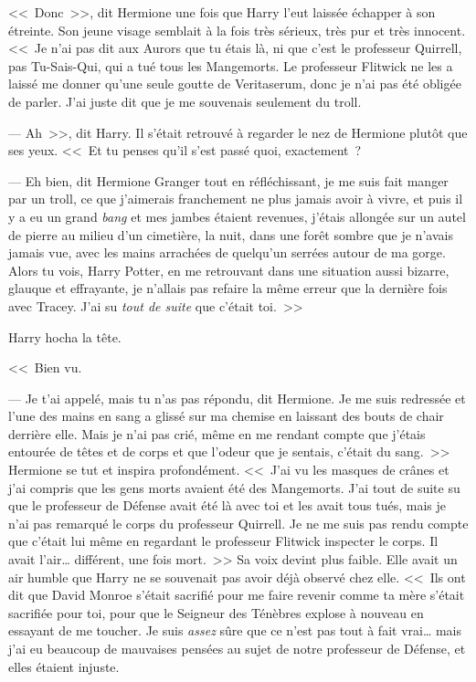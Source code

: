 <<~Donc~>>, dit Hermione une fois que Harry l'eut laissée échapper à son étreinte. Son jeune visage semblait à la fois très sérieux, très pur et très innocent. <<~Je n'ai pas dit aux Aurors que tu étais là, ni que c'est le professeur Quirrell, pas Tu-Sais-Qui, qui a tué tous les Mangemorts. Le professeur Flitwick ne les a laissé me donner qu'une seule goutte de Veritaserum, donc je n'ai pas été obligée de parler. J'ai juste dit que je me souvenais seulement du troll.

--- Ah~>>, dit Harry. Il s'était retrouvé à regarder le nez de Hermione plutôt que ses yeux. <<~Et tu penses qu'il s'est passé quoi, exactement~?

--- Eh bien, dit Hermione Granger tout en réfléchissant, je me suis fait manger par un troll, ce que j'aimerais franchement ne plus jamais avoir à vivre, et puis il y a eu un grand \emph{bang} et mes jambes étaient revenues, j'étais allongée sur un autel de pierre au milieu d'un cimetière, la nuit, dans une forêt sombre que je n'avais jamais vue, avec les mains arrachées de quelqu'un serrées autour de ma gorge. Alors tu vois, Harry Potter, en me retrouvant dans une situation aussi bizarre, glauque et effrayante, je n'allais pas refaire la même erreur que la dernière fois avec Tracey. J'ai su \emph{tout de suite} que c'était toi.~>>

Harry hocha la tête.

<<~Bien vu.

--- Je t'ai appelé, mais tu n'as pas répondu, dit Hermione. Je me suis redressée et l'une des mains en sang a glissé sur ma chemise en laissant des bouts de chair derrière elle. Mais je n'ai pas crié, même en me rendant compte que j'étais entourée de têtes et de corps et que l'odeur que je sentais, c'était du sang.~>> Hermione se tut et inspira profondément. <<~J'ai vu les masques de crânes et j'ai compris que les gens morts avaient été des Mangemorts. J'ai tout de suite su que le professeur de Défense avait été là avec toi et les avait tous tués, mais je n'ai pas remarqué le corps du professeur Quirrell. Je ne me suis pas rendu compte que c'était lui même en regardant le professeur Flitwick inspecter le corps. Il avait l'air… différent, une fois mort.~>> Sa voix devint plus faible. Elle avait un air humble que Harry ne se souvenait pas avoir déjà observé chez elle. <<~Ils ont dit que David Monroe s'était sacrifié pour me faire revenir comme ta mère s'était sacrifiée pour toi, pour que le Seigneur des Ténèbres explose à nouveau en essayant de me toucher. Je suis \emph{assez} sûre que ce n'est pas tout à fait vrai… mais j'ai eu beaucoup de mauvaises pensées au sujet de notre professeur de Défense, et elles étaient injuste.

